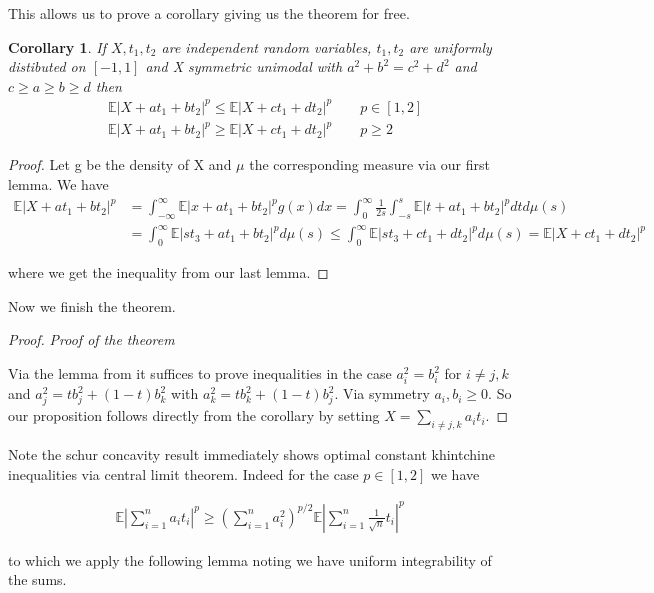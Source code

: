 \documentclass[10pt]{article}
\newcommand{\E}{\mathbb{E}}
\newcommand{\1}{\textbf{1}}
\newtheorem{corollary}[theorem]{Corollary}
\theoremstyle{remark}
\theoremstyle{definition}
\begin{document}
This allows us to prove a corollary giving us the theorem for free.

\begin{corollary}
	If $X,t_1,t_2$ are independent random variables, $t_1,t_2$ are uniformly distibuted on $[-1,1]$ and X symmetric unimodal with $a^2+b^2 = c^2+d^2$ and $c \geq a \geq b \geq d$ then
	\begin{align*}
		&\E|X + at_1 + bt_2|^p \leq \E |X+ct_1 + dt_2|^p \qquad p \in [1,2]\\
		&\E|X + at_1 + bt_2|^p \geq \E |X+ct_1 + dt_2|^p \qquad p \geq 2
	\end{align*}
\end{corollary}

\begin{proof}
	Let g be the density of X and $\mu$ the corresponding measure via our first lemma. We have
	\begin{align*}
		\E|X + at_1 + bt_2|^p &= \int_{-\infty}^{\infty}\E|x+at_1 + bt_2|^p g(x)dx = \int_0^{\infty}\frac{1}{2s}\int_{-s}^s \E|t+at_1 + bt_2|^p dt d\mu(s)\\
		&= \int_0^{\infty} \E|st_3 + at_1 + bt_2|^p d\mu(s) \leq \int_0^{\infty} \E|st_3 + ct_1 +d t_2|^p d\mu(s) = \E |X + ct_1 + dt_2|^p
	\end{align*}

	where we get the inequality from our last lemma.
\end{proof}

Now we finish the theorem.

\begin{proof}\textit{Proof of the theorem}

	Via the lemma from \cite{MO} it suffices to prove inequalities in the case $a_i^2 = b_i^2$ for $i \neq j,k$ and $a_j^2 = tb_j^2 + (1-t)b_k^2$ with $a_k^2 = tb_k^2+(1-t)b_j^2$. Via symmetry $ a_i,b_i \geq 0$. So our proposition follows directly from the corollary by setting $X = \sum_{i \neq j,k} a_it_i$. 
\end{proof}

Note the schur concavity result immediately shows optimal constant khintchine inequalities via central limit theorem. Indeed for the case $p \in [1,2]$ we have

\begin{align*}
	\E |\sum_{i=1}^n a_it_i|^p \geq (\sum_{i=1}^na_i^2)^{p/2}\E|\sum_{i=1}^n \frac{1}{\sqrt{n}}t_i|^p
\end{align*}

to which we apply the following lemma noting we have uniform integrability of the sums.
\end{document}

